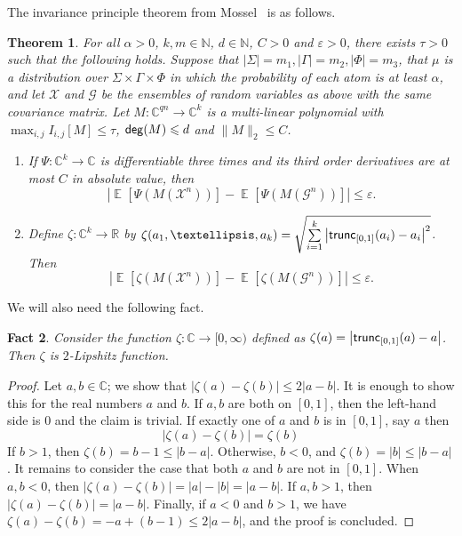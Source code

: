 \documentclass[10pt,a4paper]{amsart}
\newtheorem{thm}{Theorem}[section]
\newtheorem{fact}[thm]{Fact}
\newcommand\card[1]{\left| {#1} \right|}
\newcommand\Expect[2]{{\mathop{\mathbb{E}}_{#1}\left[ {#2} \right]}}
\newcommand\eps{\varepsilon}
\renewcommand\leq{\leqslant}
\begin{document}
The invariance principle theorem from Mossel~\cite{Mossel} is as follows.
\begin{thm}\label{thm:invariance_principle}
	For all $\alpha>0$, $k,m\in\mathbb{N}$, $d\in\mathbb{N}$, $C>0$ and $\eps>0$, there exists $\tau>0$
	such that the following holds. Suppose that $\card{\Sigma} = m_1, \card{\Gamma} = m_2,\card{\Phi}= m_3$,
	that $\mu$ is a distribution over $\Sigma\times\Gamma\times\Phi$ in which the probability
	of each atom is at least $\alpha$, and let $\mathcal{X}$ and $\mathcal{G}$ be the ensembles
	of random variables as above with the same covariance matrix. Let $M\colon\mathbb{C}^{qn}\to\mathbb{C}^k$
	is a multi-linear polynomial with $\max_{i,j}I_{i,j}[M]\leq \tau$, ${\sf deg}(M) \leq d$ and $\|M\|_2 \leq C$.
	\begin{enumerate}
		\item 
         If $\Psi\colon \mathbb{C}^{k}\to\mathbb{C}$ is differentiable three times and its third order derivatives
		are at most $C$ in absolute value, then
		\[
		\card{\Expect{}{\Psi(M(\mathcal{X}^n))}-\Expect{}{\Psi(M(\mathbf{\mathcal{G}}^n))}}\leq \eps.
		\]
		 \item Define $\zeta\colon \mathbb{C}^k\to \mathbb{R}$ by $\zeta(a_1,\ldots,a_k) = \sqrt{\sum\limits_{i=1}^{k}\card{{\sf trunc}_{[0,1]}(a_i) - a_i}^2}$.
		Then
		\[
		\card{\Expect{}{\zeta(M(\mathcal{X}^n))}-\Expect{}{\zeta(M(\mathcal{G}^n))}}\leq \eps.
		\]
	\end{enumerate}
\end{thm}


We will also need the following fact.
\begin{fact}\label{fact:trivial_lipshitz_pf}
	Consider the function $\zeta\colon \mathbb{C}\to [0,\infty)$ defined as
	$\zeta(a) = \card{{\sf trunc}_{[0,1]}(a) - a}$. Then $\zeta$ is $2$-Lipshitz function.
\end{fact}
\begin{proof}
	Let $a,b\in\mathbb{C}$; we show that $\card{\zeta(a) - \zeta(b)} \leq 2\card{a-b}$. It is enough to show this for the real numbers $a$ and $b$.  
	If $a,b$ are both on $[0,1]$, then the left-hand side is
	$0$ and the claim is trivial. If exactly one of $a$ and $b$ is in $[0,1]$, say $a$ then
	\[
	\card{\zeta(a) - \zeta(b)} =
	\zeta(b)
	\]
	If $b>1$, then $\zeta(b) = b-1 \leq \card{b-a}$. Otherwise, $b<0$, and $\zeta(b) = |b|\leq \card{b-a}$. It remains to consider the case that both $a$ and $b$ are not in $[0,1]$. When $a, b<0$, then $\card{\zeta(a) - \zeta(b)} = \card{a}-\card{b} =  \card{a-b}$. If $a, b>1$, then $\card{\zeta(a) - \zeta(b)} = \card{a-b}$. Finally, if $a<0$ and $b>1$, we have $\zeta(a) - \zeta(b) = -a+(b-1)\leq 2\card{a-b}$,
	and the proof is concluded.
\end{proof}
\end{document}

